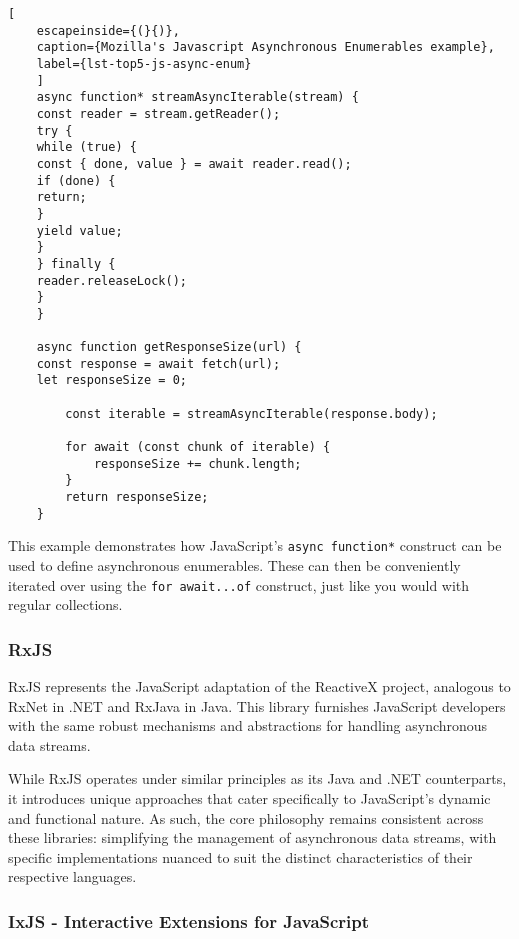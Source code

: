 \begin{center}
	\lstset{basicstyle=\scriptsize\ttfamily,frame=bottomline}
	\centering
	\begin{lstlisting}[
	escapeinside={(}{)},
	caption={Mozilla's Javascript Asynchronous Enumerables example},
	label={lst-top5-js-async-enum}
	]
	async function* streamAsyncIterable(stream) {
	const reader = stream.getReader();
	try {
	while (true) {
	const { done, value } = await reader.read();
	if (done) {
	return;
	}
	yield value;
	}
	} finally {
	reader.releaseLock();
	}
	}
	
	async function getResponseSize(url) {
	const response = await fetch(url);
	let responseSize = 0;
		
		const iterable = streamAsyncIterable(response.body);
		
		for await (const chunk of iterable) {
			responseSize += chunk.length;
		}
		return responseSize;
	}  
		\end{lstlisting}
	\end{center}

This example demonstrates how JavaScript's \texttt{async function*} construct can be used to define asynchronous enumerables. These can then be conveniently iterated over using the \texttt{for await...of} construct, just like you would with regular collections.


\subsubsection{RxJS}
\label{rxjs}

RxJS represents the JavaScript adaptation of the ReactiveX project, analogous to RxNet in .NET and RxJava in Java. This library furnishes JavaScript developers with the same robust mechanisms and abstractions for handling asynchronous data streams. 

While RxJS operates under similar principles as its Java and .NET counterparts, it introduces unique approaches that cater specifically to JavaScript's dynamic and functional nature. As such, the core philosophy remains consistent across these libraries: simplifying the management of asynchronous data streams, with specific implementations nuanced to suit the distinct characteristics of their respective languages.


\subsubsection{IxJS - Interactive Extensions for JavaScript}
\label{ixjs}

